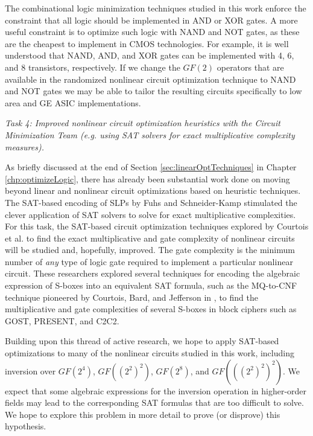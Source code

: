 The combinational logic minimization techniques studied in this work enforce the constraint that all logic should be implemented in AND or XOR gates. A more useful constraint is to optimize such logic with NAND and NOT gates, as these are the cheapest to implement in CMOS technologies. For example, it is well understood that NAND, AND, and XOR gates can be implemented with 4, 6, and 8 transistors, respectively. If we change the $GF(2)$ operators that are available in the randomized nonlinear circuit optimization technique to NAND and NOT gates we may be able to tailor the resulting circuits specifically to low area and GE ASIC implementations. 

\vspace*{1em}
\begin{minipage}{.9\textwidth}
  \emph{Task 4: Improved nonlinear circuit optimization heuristics with the Circuit Minimization Team (e.g. using SAT solvers for exact multiplicative complexity measures).}
\end{minipage}
\vspace*{1em}

As briefly discussed at the end of Section \ref{sec:linearOptTechniques} in Chapter \ref{chp:optimizeLogic}, there has already been substantial work done on moving beyond linear and nonlinear circuit optimizations based on heuristic techniques. The SAT-based encoding of SLPs by Fuhs and Schneider-Kamp \cite{Fuhs10-1} stimulated the clever application of SAT solvers to solve for exact multiplicative complexities. For this task, the SAT-based circuit optimization techniques explored by Courtois et al. \cite{Courtois11-1} to find the exact multiplicative and gate complexity of nonlinear circuits will be studied and, hopefully, improved. The gate complexity is the minimum number of \emph{any} type of logic gate required to implement a particular nonlinear circuit. These researchers explored several techniques for encoding the algebraic expression of S-boxes into an equivalent SAT formula, such as the MQ-to-CNF technique pioneered by Courtois, Bard, and Jefferson in \cite{Courtois07-1}, to find the multiplicative and gate complexities of several S-boxes in block ciphers such as GOST, PRESENT, and C2C2. 

Building upon this thread of active research, we hope to apply SAT-based optimizations to many of the nonlinear circuits studied in this work, including inversion over $GF(2^4)$, $GF((2^2)^2)$, $GF(2^8)$, and $GF(((2^2)^2)^2)$. We expect that some algebraic expressions for the inversion operation in higher-order fields may lead to the corresponding SAT formulas that are too difficult to solve. We hope to explore this problem in more detail to prove (or disprove) this hypothesis.

